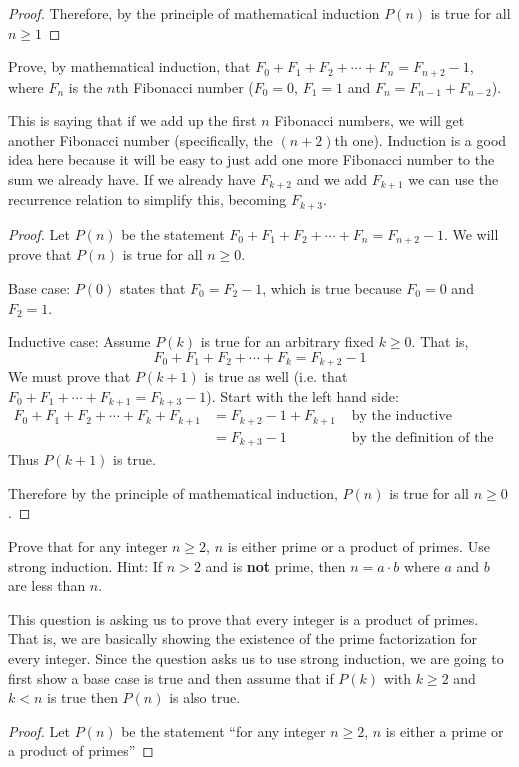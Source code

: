 \begin{questions}
\begin{solution}
\begin{proof}
Therefore, by the principle of mathematical induction $P(n)$ is true for all $n \geq 1$ 
\end{proof}
\end{solution}
\question  Prove, by mathematical induction, that $F_0 + F_1 + F_2 + \cdots + F_{n} = F_{n+2} - 1$, where $F_n$ is the $n$th Fibonacci number ($F_0 = 0$, $F_1 = 1$ and $F_n = F_{n-1} + F_{n-2}$).
\begin{solution}
This is saying that if we add up the first $n$ Fibonacci numbers, we will get another Fibonacci number (specifically, the $(n+2)$th one).  Induction is a good idea here because it will be easy to just add one more Fibonacci number to the sum we already have.  If we already have $F_{k+2}$ and we add $F_{k+1}$ we can use the recurrence relation to simplify this, becoming $F_{k+3}$.  
 
  \begin{proof}
    Let $P(n)$ be the statement $F_0 + F_1 + F_2 + \cdots + F_n = F_{n+2} - 1$.  We will prove that $P(n)$ is true for all $n \ge 0$.  
    
    Base case: $P(0)$ states that $F_0 = F_2 - 1$, which is true because $F_0 = 0$ and $F_2 = 1$.
    
    Inductive case:  Assume $P(k)$ is true for an arbitrary fixed $k \ge 0$.  That is, \[F_0 + F_1 + F_2 + \cdots + F_k = F_{k+2} - 1\]
    We must prove that $P(k+1)$ is true as well (i.e. that $F_0 + F_1 + \cdots +F_{k+1} = F_{k+3} - 1$).  Start with the left hand side:
    \begin{align*}
      F_0 + F_1 + F_2 + \cdots + F_k + F_{k+1} & = F_{k+2} - 1 + F_{k+1} & \mbox{ by the inductive hypothesis}\\
      & = F_{k+3} - 1 & \mbox{ by the definition of the Fibonacci numbers}
    \end{align*}
    Thus $P(k+1)$ is true.
    
    Therefore by the principle of mathematical induction, $P(n)$ is true for all $n \ge 0$.
  \end{proof}

\end{solution}

\question Prove that for any integer $n\geq 2$, $n$ is either prime or a product of primes. Use strong induction.  Hint: If $n > 2$ and is \textbf{not} prime, then $n = a\cdot b$ where $a$ and $b$ are less than $n$.

\begin{solution}
This question is asking us to prove that every integer is a product of primes. That is, we are basically showing the existence of the prime factorization for every integer. Since the question asks us to use strong induction, we are going to first show a base case is true and then assume that if $P(k)$ with $k\geq 2$ and $k<n$ is true then $P(n)$ is also true.
\begin{proof}
Let $P(n)$ be the statement ``for any integer $n\geq 2$, $n$ is either a prime or a product of primes''


\end{proof}
\end{solution}
\end{questions}
